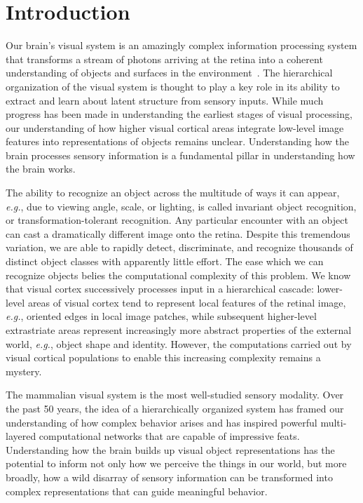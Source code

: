 \chapter{Introduction}
\label{introduction}

Our brain's visual system is an amazingly complex information processing system that transforms a stream of photons arriving at the retina into a coherent understanding of objects and surfaces in the environment~\cite{DiCarlo2007, Cox2014}. The hierarchical organization of the visual system is thought to play a key role in its ability to extract and learn about latent structure from sensory inputs. While much progress has been made in understanding the earliest stages of visual processing, our understanding of how higher visual cortical areas integrate low-level image features into representations of objects remains unclear. Understanding how the brain processes sensory information is a fundamental pillar in understanding how the brain works. 

The ability to recognize an object across the multitude of ways it can appear, \textit{e.g.}, due to viewing angle, scale, or lighting, is called invariant object recognition, or transformation-tolerant recognition. Any particular encounter with an object can cast a dramatically different image onto the retina. Despite this tremendous variation, we are able to rapidly detect, discriminate, and recognize thousands of distinct object classes with apparently little effort. The ease which we can recognize objects belies the computational complexity of this problem. We know that visual cortex successively processes input in a hierarchical cascade: lower-level areas of visual cortex tend to represent local features of the retinal image, \textit{e.g.}, oriented edges in local image patches, while subsequent higher-level extrastriate areas represent increasingly more abstract properties of the external world, \textit{e.g.}, object shape and identity. However, the computations carried out by visual cortical populations to enable this increasing complexity remains a mystery.

The mammalian visual system is the most well-studied sensory modality. Over the past 50 years\cite{Hubel1962}, the idea of a hierarchically organized system has framed our understanding of how complex behavior arises and has inspired powerful multi-layered computational networks that are capable of impressive feats\cite{Riesenhuber1999, Krizhevsky2012}. Understanding how the brain builds up visual object representations has the potential to inform not only how we perceive the things in our world, but more broadly, how a wild disarray of sensory information can be transformed into complex representations that can guide meaningful behavior.


